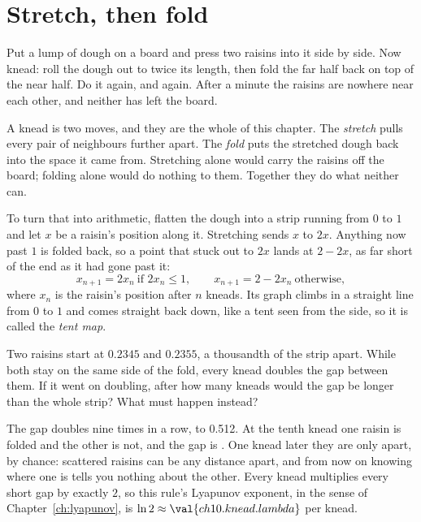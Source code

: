 \section{Stretch, then fold}
\label{sec:ch10-knead}

\noindent
Put a lump of dough on a board and press two raisins into it side by side.
Now knead: roll the dough out to twice its length, then fold the far half
back on top of the near half. Do it again, and again. After a minute the
raisins are nowhere near each other, and neither has left the board.

A knead is two moves, and they are the whole of this chapter. The
\emph{stretch} pulls every pair of neighbours further apart. The \emph{fold}
puts the stretched dough back into the space it came from. Stretching alone
would carry the raisins off the board; folding alone would do nothing to
them. Together they do what neither can.

To turn that into arithmetic, flatten the dough into a strip running from
$0$ to $1$ and let $x$ be a raisin's position along it. Stretching sends $x$
to $2x$. Anything now past $1$ is folded back, so a point that stuck out to
$2x$ lands at $2 - 2x$, as far short of the end as it had gone past it:
\[ x_{n+1} = 2x_n \ \text{if } 2x_n \le 1, \qquad
   x_{n+1} = 2 - 2x_n \ \text{otherwise}, \]
where $x_n$ is the raisin's position after $n$ kneads. Its graph climbs in a
straight line from $0$ to $1$ and comes straight back down, like a tent seen
from the side, so it is called the \emph{tent map}.

\begin{think}
Two raisins start at $\num{0.2345}$ and $\num{0.2355}$, a thousandth of the
strip apart. While both stay on the same side of the fold, every knead
doubles the gap between them. If it went on doubling, after how many kneads
would the gap be longer than the whole strip? What must happen instead?
\end{think}



\noindent
The gap doubles nine times in a row, to \num{0.512}. At the tenth knead one
raisin is folded and the other is not, and the gap is .
One knead later they are only  apart, by chance:
scattered raisins can be any distance apart, and from now on knowing where
one is tells you nothing about the other. Every knead multiplies every short gap by
exactly $2$, so this rule's Lyapunov exponent, in the sense of
Chapter~\ref{ch:lyapunov}, is $\ln 2 \approx \val{ch10.knead.lambda}$ per
knead.

